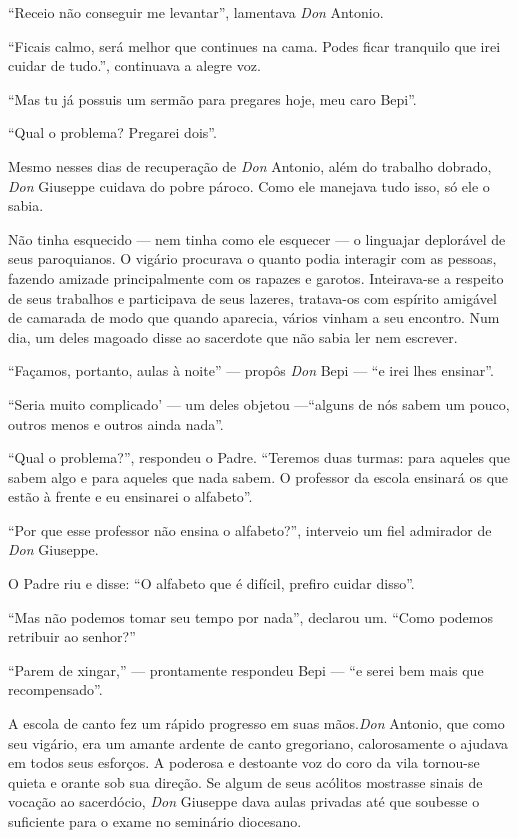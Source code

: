 \documentclass[12pt,a4paper,oneside]{book}
\begin{document}
\quad ``Receio não conseguir me levantar'', lamentava \emph{Don} Antonio.

\quad ``Ficais calmo, será melhor que continues na cama. Podes ficar tranquilo que irei cuidar de tudo.'', continuava a alegre voz.

\quad ``Mas tu já possuis um sermão para pregares hoje, meu caro Bepi''.

\quad ``Qual o problema? Pregarei dois''.

\quad Mesmo nesses dias de recuperação de \emph{Don} Antonio, além do trabalho dobrado, \emph{Don} Giuseppe cuidava do pobre pároco. Como ele manejava tudo isso, só ele o sabia.

\quad Não tinha esquecido --- nem tinha como ele esquecer --- o linguajar deplorável de seus paroquianos. O vigário procurava o quanto podia interagir com as pessoas, fazendo amizade principalmente com os rapazes e garotos. Inteirava-se a respeito de seus trabalhos e participava de seus lazeres, tratava-os com espírito amigável de camarada de modo que quando aparecia, vários vinham a seu encontro. Num dia, um deles magoado disse ao sacerdote que não sabia ler nem escrever.

\quad ``Façamos, portanto, aulas à noite'' --- propôs \emph{Don} Bepi --- ``e irei lhes ensinar''.

\quad ``Seria muito complicado' --- um deles objetou ---``alguns de nós sabem um pouco, outros menos e outros ainda nada''.

\quad ``Qual o problema?'', respondeu o Padre. ``Teremos duas turmas: para aqueles que sabem algo e para aqueles que nada sabem. O professor da escola ensinará os que estão à frente e eu ensinarei o alfabeto''.

\quad ``Por que esse professor não ensina o alfabeto?'', interveio um fiel admirador de \emph{Don} Giuseppe.

\quad O Padre riu e disse: ``O alfabeto que é difícil, prefiro cuidar disso''.

\quad  ``Mas não podemos tomar seu tempo por nada'', declarou um. ``Como podemos retribuir ao senhor?''

\quad ``Parem de xingar,'' --- prontamente respondeu Bepi --- ``e serei bem mais que recompensado''.

\quad A escola de canto fez um rápido progresso em suas mãos.\emph{Don} Antonio, que como seu vigário, era um amante ardente de canto gregoriano, calorosamente o ajudava em todos seus esforços. A poderosa e destoante voz do coro da vila tornou-se quieta e orante sob sua direção. Se algum de seus acólitos mostrasse sinais de vocação ao sacerdócio, \emph{Don} Giuseppe dava aulas privadas até que soubesse o suficiente para o exame no seminário diocesano.
\end{document}
